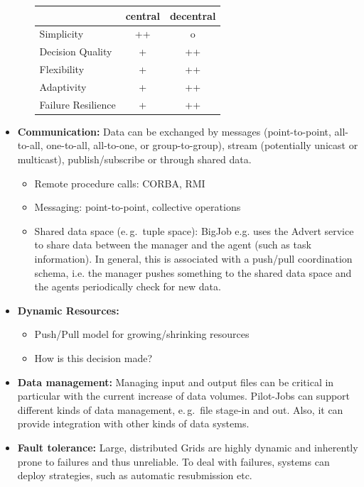 \documentclass[]{article}
\begin{document}
\begin{itemize}
\begin{itemize}
			\begin{tabular}{|l|c|c|}
				\hline
				&central &decentral\\
				\hline
			Simplicity  &++			&o \\ \hline
			Decision Quality &+ 	&++ \\ \hline
			Flexibility &+			&++ \\ \hline
			Adaptivity  &+ 			&++ \\ \hline
			Failure Resilience &+   &++\\ \hline
			
			\end{tabular}

	\end{itemize}	
	\item \textbf{Communication:} Data can be exchanged by messages
(point-to-point, all-to-all, one-to-all, all-to-one, or group-to-group),
stream (potentially unicast or multicast), publish/subscribe or through shared
data.
	\begin{itemize}
		\item Remote procedure calls: CORBA, RMI
		\item Messaging: point-to-point, collective operations
		\item Shared data space (e.\,g.\ tuple space): BigJob e.g. uses the Advert service to share data between the manager and the agent (such as task information). In general, this is associated with a push/pull coordination schema, i.e. the manager pushes something to the shared data space and the agents periodically check for new data.
	\end{itemize} 
	\item \textbf{Dynamic Resources:}
		\begin{itemize}
			\item Push/Pull model for growing/shrinking resources
			\item How is this decision made?
		\end{itemize}
	\item \textbf{Data management:} Managing input and output files can be critical in particular with the current increase of data volumes. Pilot-Jobs can support different kinds of data management, e.\,g.\ file stage-in and out. Also, it can provide integration with other kinds of data systems.
	\item \textbf{Fault tolerance:} Large, distributed Grids are highly dynamic and inherently prone to failures and thus unreliable. To deal with failures, systems can deploy strategies, such as automatic resubmission etc.

\end{itemize}
\end{document}
